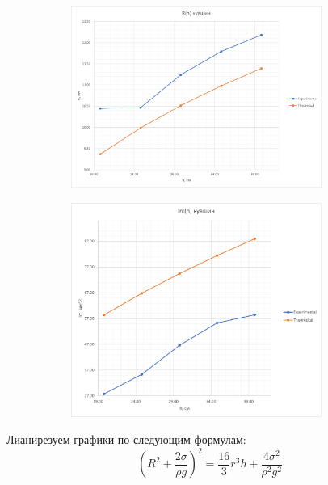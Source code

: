 \documentclass[a4paper, 12pt]{article}
\begin{document}
\begin{figure}[H]
    \begin{subfigure}{0.5\textwidth}
        \includegraphics[width=0.9\textwidth]{img/R(h) кувшин.png}
    \end{subfigure}%
    \begin{subfigure}{0.5\textwidth}
        \includegraphics[width=0.9\textwidth]{img/lrc(h) кувшин.png}
    \end{subfigure}
\end{figure}

Лианирезуем графики по следующим формулам:
\begin{equation}
    (R^2+\frac{2\sigma}{{\rho}g})^2=\frac{16}{3}r^3h+\frac{4\sigma^2}{\rho^2g^2}
\end{equation}
\end{document}

